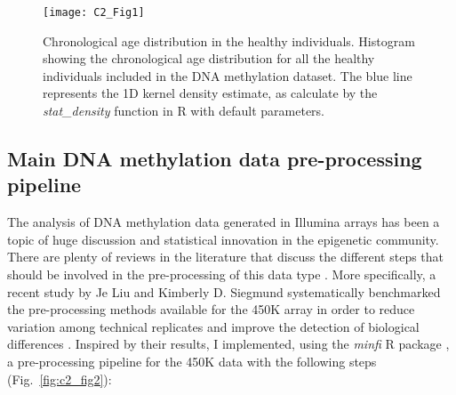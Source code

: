 \begin{figure}[htbp!] 
	\centering    
	\texttt{[image: C2\_Fig1]}
	\vspace*{2mm}
	\caption[Chronological age distribution in the healthy individuals]{Chronological age distribution in the healthy individuals. Histogram showing the chronological age distribution for all the healthy individuals included in the DNA methylation dataset. The blue line represents the 1D kernel density estimate, as calculate by the \textit{stat\_density} function in R with default parameters.}
	\label{fig:c2_fig1}
\end{figure}

\smallskip

\subsection{Main DNA methylation data pre-processing pipeline}

\smallskip

The analysis of DNA methylation data generated in Illumina arrays has been a topic of huge discussion and statistical innovation in the epigenetic community. There are plenty of reviews in the literature that discuss the different steps that should be involved in the pre-processing of this data type \cite{Wilhelm-Benartzi2013,Morris2015,Liu2016}. More specifically, a recent study by Je Liu and Kimberly D. Siegmund systematically benchmarked the pre-processing methods available for the 450K array in order to reduce variation among technical replicates and improve the detection of biological differences \cite{Liu2016}. Inspired by their results, I implemented, using the \textit{minfi} R package \cite{Aryee2014}, a pre-processing pipeline for the 450K data with the following steps (Fig.~\ref{fig:c2_fig2}):

